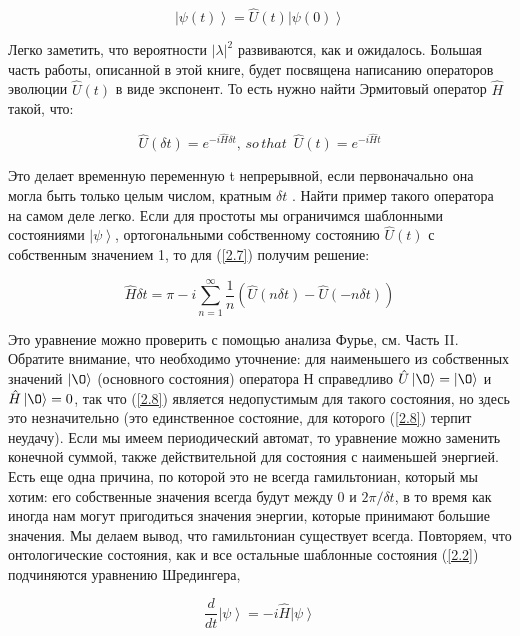 \documentclass[main.tex]{subfiles}
\begin{document}
\begin{equation}\label{2.6}
	 \left|\psi(t)\right> = \hat U(t) \left|\psi(0)\right>
\end{equation}

Легко заметить, что вероятности $\left |\lambda\right |^2 $ развиваются, как и ожидалось. Большая часть работы, описанной в этой книге, будет посвящена написанию операторов эволюции $\hat U(t)$ в виде экспонент. То есть нужно найти Эрмитовый оператор $\hat H$ такой, что:

\begin{equation}\label{2.7}
	 \hat U(\delta t) = e^{-i\hat H\delta t},\,so\,that\,\,\,\hat U( t) = e^{-i\hat H t}
\end{equation}


Это делает временную переменную t непрерывной, если первоначально она могла быть только целым числом, кратным $\delta t$ . Найти пример такого оператора на самом деле легко. Если для простоты мы ограничимся шаблонными состояниями $\left|\psi\right>$, ортогональными собственному состоянию $\hat U(t)$ с собственным значением 1, то для (\ref{2.7}) получим решение:  

\begin{equation}\label{2.8}
	\hat H \delta t=\pi-i \sum_{n=1}^{\infty} \frac{1}{n}\left(\hat U(n \delta t)-\hat U(-n \delta t)\right)
\end{equation}

Это уравнение можно проверить с помощью анализа Фурье, см. Часть II. Обратите внимание, что необходимо уточнение: для наименьшего из собственных значений $\left|\O\right>$ (основного состояния) оператора Н справедливо $\hat U\left|\O\right> = \left|\O\right>$ и $\hat H\left|\O\right> = 0$, так что (\ref{2.8}) является недопустимым для такого состояния, но здесь это незначительно (это единственное состояние, для которого (\ref{2.8}) терпит неудачу). Если мы имеем периодический автомат, то уравнение можно заменить конечной суммой, также действительной для состояния с наименьшей энергией. Есть еще одна причина, по которой это не всегда гамильтониан, который мы хотим: его собственные значения всегда будут между 0 и $2\pi/\delta t$, в то время как иногда нам могут пригодиться значения энергии, которые принимают большие значения. Мы делаем вывод, что гамильтониан существует всегда. Повторяем, что онтологические состояния, как и все остальные шаблонные состояния (\ref{2.2}) подчиняются уравнению Шредингера, 

\begin{equation}\label{2.9}
	\frac d {dt} \left|\psi\right> = -i \hat H \left|\psi\right> 
\end{equation}
\end{document}

